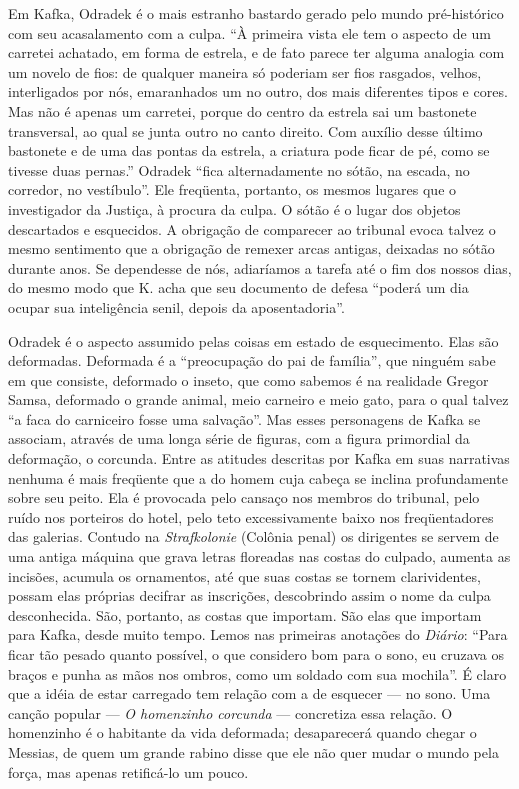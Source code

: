 Em Kafka, Odradek é o mais estranho bastardo gerado pelo mundo
pré-histórico com seu acasalamento com a culpa. ``À primeira vista ele
tem o aspecto de um carretei achatado, em forma de estrela, e de fato
parece ter alguma analogia com um novelo de fios: de qualquer maneira só
poderiam ser fios rasgados, velhos, interligados por nós, emaranhados um
no outro, dos mais diferentes tipos e cores. Mas não é apenas um
carretei, porque do centro da estrela sai um bastonete transversal, ao
qual se junta outro no canto direito. Com auxílio desse último bastonete
e de uma das pontas da estrela, a criatura pode ficar de pé, como se
tivesse duas pernas.'' Odradek ``fica alternadamente no sótão, na
escada, no corredor, no vestíbulo''. Ele freqüenta, portanto, os mesmos
lugares que o investigador da Justiça, à procura da culpa. O sótão é o
lugar dos objetos descartados e esquecidos. A obrigação de comparecer ao
tribunal evoca talvez o mesmo sentimento que a obrigação de remexer
arcas antigas, deixadas no sótão durante anos. Se dependesse de nós,
adiaríamos a tarefa até o fim dos nossos dias, do mesmo modo que K. acha
que seu documento de defesa ``poderá um dia ocupar sua inteligência
senil, depois da aposentadoria''.

Odradek é o aspecto assumido pelas coisas em estado de esquecimento.
Elas são deformadas. Deformada é a ``preocupação do pai de família'',
que ninguém sabe em que consiste, deformado o inseto, que como sabemos é
na realidade Gregor Samsa, deformado o grande animal, meio carneiro e
meio gato, para o qual talvez ``a faca do carniceiro fosse uma
salvação''. Mas esses personagens de Kafka se associam, através de uma
longa série de figuras, com a figura primordial da deformação, o
corcunda. Entre as atitudes descritas por Kafka em suas narrativas
nenhuma é mais freqüente que a do homem cuja cabeça se inclina
profundamente sobre seu peito. Ela é provocada pelo cansaço nos membros
do tribunal, pelo ruído nos porteiros do hotel, pelo teto excessivamente
baixo nos freqüentadores das galerias. Contudo na \textit{Strafkolonie} (Colônia
penal) os dirigentes se servem de uma antiga máquina que grava letras
floreadas nas costas do culpado, aumenta as incisões, acumula os
ornamentos, até que suas costas se tornem clarividentes, possam elas
próprias decifrar as inscrições, descobrindo assim o nome da culpa
desconhecida. São, portanto, as costas que importam. São elas que
importam para Kafka, desde muito tempo. Lemos nas primeiras anotações do
\textit{Diário}: ``Para ficar tão pesado quanto possível, o que considero bom
para o sono, eu cruzava os braços e punha as mãos nos ombros, como um
soldado com sua mochila''. É claro que a idéia de estar carregado tem
relação com a de esquecer --- no sono. Uma canção popular --- \textit{O
homenzinho corcunda} --- concretiza essa relação. O homenzinho é o
habitante da vida deformada; desaparecerá quando chegar o Messias, de
quem um grande rabino disse que ele não quer mudar o mundo pela força,
mas apenas retificá-lo um pouco.

